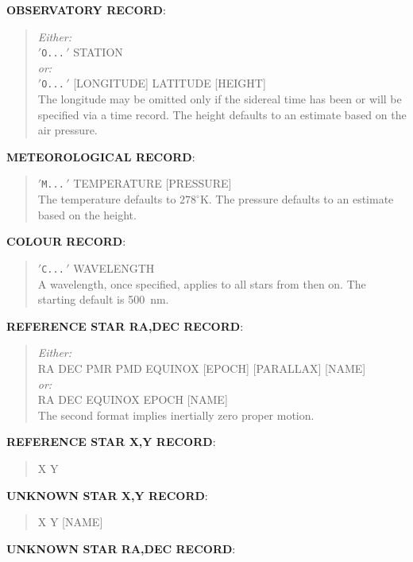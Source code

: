 \goodbreak
{\bf OBSERVATORY RECORD}:

\begin{quote}
 {\it Either:} \\
 $'$\verb|O...|$\,'$ STATION \\
 {\it or:} \\
 $'$\verb|O...|$\,'$ [LONGITUDE] LATITUDE [HEIGHT] \\
 The longitude may be omitted only if the sidereal
 time has been or will be specified via a time record.
 The height defaults to an estimate based on the air pressure.
\end{quote}

\goodbreak
{\bf METEOROLOGICAL RECORD}:

\begin{quote}
 $'$\verb|M...|$\,'$ TEMPERATURE [PRESSURE] \\
 The temperature defaults to $278^\circ$K.
 The pressure defaults to an estimate based on the height.
\end{quote}

\goodbreak
{\bf COLOUR RECORD}:

\begin{quote}
 $'$\verb|C...|$\,'$ WAVELENGTH \\
 A wavelength, once specified, applies to all stars from then on.
 The starting default is 500~nm.
\end{quote}

\goodbreak
{\bf REFERENCE STAR RA,DEC RECORD}:

\begin{quote}
 {\it Either:} \\
 RA DEC PMR PMD EQUINOX [EPOCH] [PARALLAX] [NAME] \\
 {\it or:} \\
 RA DEC EQUINOX EPOCH [NAME] \\
 The second format implies inertially zero proper motion.
\end{quote}

\goodbreak
{\bf REFERENCE STAR X,Y RECORD}:

\begin{quote}
 X Y
\end{quote}

\goodbreak
{\bf UNKNOWN STAR X,Y RECORD}:

\begin{quote}
 X Y [NAME]
\end{quote}

\goodbreak
{\bf UNKNOWN STAR RA,DEC RECORD}:

